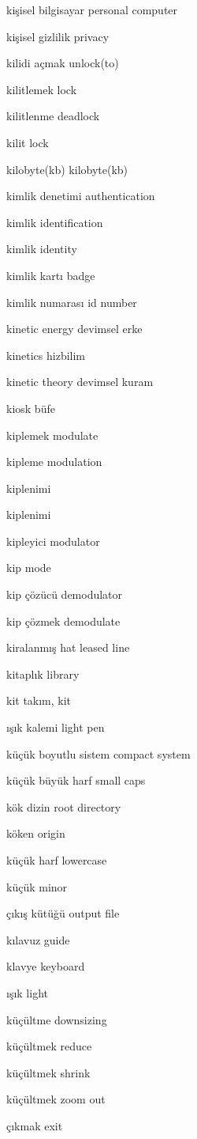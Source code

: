 \documentclass[12pt,fleqn]{article}\usepackage{../../common}
\begin{document}
kişisel bilgisayar personal computer

kişisel gizlilik privacy

kilidi açmak unlock(to)

kilitlemek lock

kilitlenme deadlock

kilit lock

kilobyte(kb) kilobyte(kb)

kimlik denetimi authentication

kimlik identification

kimlik identity

kimlik kartı badge

kimlik numarası id number

kinetic energy devimsel erke

kinetics hizbilim

kinetic theory devimsel kuram

kiosk büfe

kiplemek modulate

kipleme modulation

kiplenimi

kiplenimi

kipleyici modulator

kip mode

kip çözücü demodulator

kip çözmek demodulate

kiralanmış hat leased line

kitaplık library

kit takım, kit

ışık kalemi light pen

küçük boyutlu sistem compact system

küçük büyük harf small caps

kök dizin root directory

köken origin

küçük harf lowercase

küçük minor

çıkış kütüğü output file

kılavuz guide

klavye keyboard

ışık light

küçültme downsizing

küçültmek reduce

küçültmek shrink

küçültmek zoom out

çıkmak exit
\end{document}
